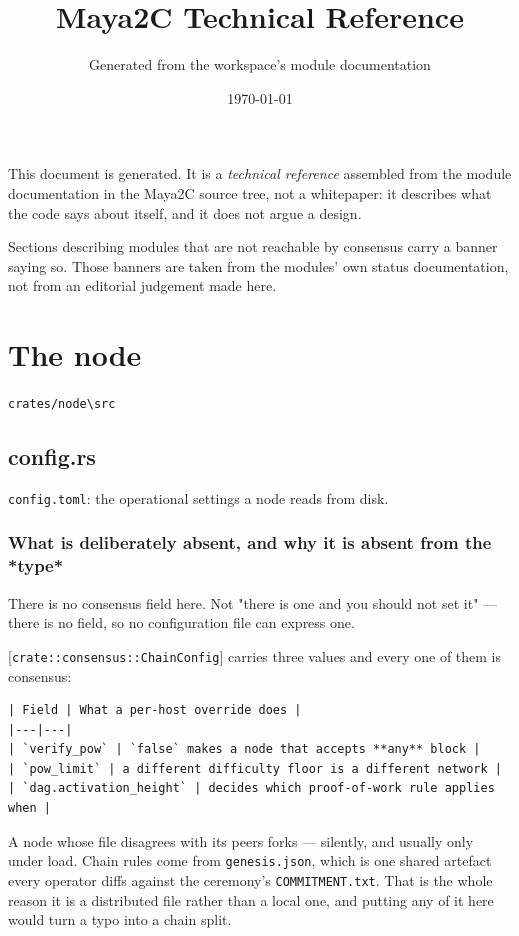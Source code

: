 \documentclass[11pt,a4paper]{article}
\title{Maya2C Technical Reference}
\author{Generated from the workspace's module documentation}
\date{\today}
\begin{document}
\maketitle

\begin{framed}
\noindent This document is generated. It is a \emph{technical reference}
assembled from the module documentation in the Maya2C source tree, not a
whitepaper: it describes what the code says about itself, and it does not argue
a design.

\medskip

\noindent Sections describing modules that are not reachable by consensus carry
a banner saying so. Those banners are taken from the modules' own status
documentation, not from an editorial judgement made here.
\end{framed}

\tableofcontents
\newpage
\section{The node}
\noindent\texttt{crates/node\textbackslash{}src}

\subsection{config.rs}
\texttt{config.toml}: the operational settings a node reads from disk.

\subsubsection{What is deliberately absent, and why it is absent from the *type*}

There is no consensus field here. Not "there is one and you should not set
it" — there is no field, so no configuration file can express one.

[\texttt{crate::consensus::ChainConfig}] carries three values and every one of them
is consensus:

\begin{verbatim}
| Field | What a per-host override does |
|---|---|
| `verify_pow` | `false` makes a node that accepts **any** block |
| `pow_limit` | a different difficulty floor is a different network |
| `dag.activation_height` | decides which proof-of-work rule applies when |
\end{verbatim}

A node whose file disagrees with its peers forks — silently, and usually
only under load. Chain rules come from \texttt{genesis.json}, which is one shared
artefact every operator diffs against the ceremony's \texttt{COMMITMENT.txt}. That
is the whole reason it is a distributed file rather than a local one, and
putting any of it here would turn a typo into a chain split.
\end{document}
